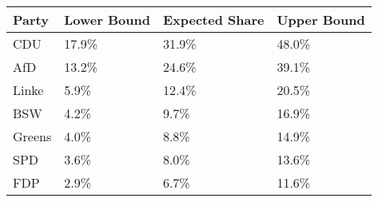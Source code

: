 \begin{tabular}{llll}
  \hline
Party & Lower Bound & Expected Share & Upper Bound \\ 
  \hline
CDU & 17.9\% & 31.9\% & 48.0\% \\ 
  AfD & 13.2\% & 24.6\% & 39.1\% \\ 
  Linke & 5.9\% & 12.4\% & 20.5\% \\ 
  BSW & 4.2\% & 9.7\% & 16.9\% \\ 
  Greens & 4.0\% & 8.8\% & 14.9\% \\ 
  SPD & 3.6\% & 8.0\% & 13.6\% \\ 
  FDP & 2.9\% & 6.7\% & 11.6\% \\ 
   \hline
\end{tabular}
